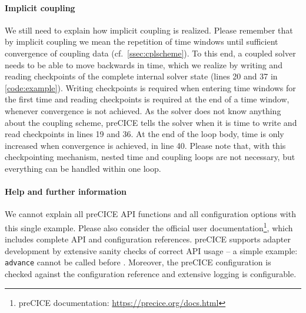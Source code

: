 \paragraph{Implicit coupling}
We still need to explain how implicit coupling is realized. Please remember that by implicit coupling we mean the repetition of time windows until sufficient convergence of coupling data (cf.~\autoref{ssec:cplscheme}). To this end, a coupled solver needs to be able to move backwards in time, which we realize by writing and reading checkpoints of the complete internal solver state (lines 20 and 37 in \autoref{code:example}). Writing checkpoints is required when entering time windows for the first time and reading checkpoints is required at the end of a time window, whenever convergence is not achieved. As the solver does not know anything about the coupling scheme, preCICE tells the solver when it is time to write and read checkpoints in lines 19 and 36. At the end of the loop body, time is only increased when convergence is achieved, in line 40. Please note that, with this checkpointing mechanism, nested time and coupling loops are not necessary, but everything can be handled within one  loop.


\paragraph{Help and further information}
We cannot explain all preCICE API functions and all configuration options with this single example. Please also consider the official user documentation\footnote{preCICE documentation: \url{https://precice.org/docs.html}}, which includes complete API and configuration references.
preCICE supports adapter development by extensive sanity checks of correct API usage -- a simple example: \texttt{advance} cannot be called before . Moreover, the preCICE configuration is checked against the configuration reference and extensive logging is configurable.


